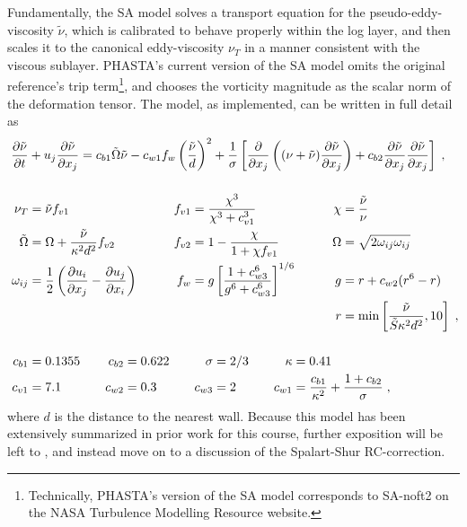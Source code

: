 \documentclass[11pt]{article}
\begin{document}
Fundamentally, the SA model solves a transport equation for the pseudo-eddy-viscosity $\tilde{\nu}$, which is calibrated to behave properly within the log layer, and then scales it to the canonical eddy-viscosity $\nu_T$ in a manner consistent with the viscous sublayer. PHASTA's current version of the SA model omits the original reference's trip term\footnote{Technically, PHASTA's version of the SA model corresponds to SA-noft2 on the NASA Turbulence Modelling Resource website.}, and chooses the vorticity magnitude as the scalar norm of the deformation tensor. The model, as implemented, can be written in full detail as
\begin{align}
	\phantom{W_{ij}}
	&\begin{aligned}
		\mathllap{\pp{\tilde{\nu}}{t}}
		&+ u_j \pp{\tilde{\nu}}{x_j}
		=
		c_{b1} \tilde{\Omega} \tilde{\nu}
		-
		c_{w1} f_w \left( \frac{\tilde{\nu}}{d} \right)^2
		+
		\frac{1}{\sigma} 
		\left[
		\pp{}{x_j}
			\left( (\nu + \tilde{\nu}) \pp{\tilde{\nu}}{x_j} \right)
			+ c_{b2} \pp{\tilde{\nu}}{x_j} \pp{\tilde{\nu}}{x_j}
		\right]
		\;,
		\label{eq:SA_transport}
	\end{aligned} \\[0.5cm]
	&\begin{aligned}
		\mathllap{\nu_T} &= \tilde{\nu} f_{v1}
		&\qquad
		f_{v1} &= \frac{\chi^3}{\chi^3 + c_{v1}^3}
		&\qquad
		\chi &= \frac{\tilde{\nu}}{\nu}
		\\
		\mathllap{\tilde{\Omega}} &= \Omega + \frac{\tilde{\nu}}{\kappa^2 d^2} f_{v2}
		&\qquad
		f_{v2} &= 1 - \frac{\chi}{1 + \chi f_{v1}}
		&\qquad
		\Omega &= \sqrt{2 \omega_{ij} \omega_{ij}}
		\\
		\mathllap{\omega_{ij}} &= \frac{1}{2} \left( \pp{u_i}{x_j} - \pp{u_j}{x_i} \right)
		&\qquad
		f_w &= g \left[ \frac{1 + c_{w3}^6}{g^6 + c_{w3}^6} \right]^{1/6}
		&\qquad
		g &= r + c_{w2}(r^6 - r)
		\\
		&&&&
		r &= \min \left[ \frac{\tilde{\nu}}{\tilde{S} \kappa^2 d^2}, 10 \right]
		\;,
		\label{eq:SA_definitions}
	\end{aligned} \\[0.5cm]
	&\begin{aligned}
		\mathllap{c_{b1}} &= 0.1355
		&\quad
		c_{b2} &= 0.622
		&\quad
		\sigma &= 2/3
		&\quad
		\kappa &= 0.41
		\\
		\mathllap{c_{v1}} &= 7.1
		&\quad
		c_{w2} &= 0.3
		&\quad
		c_{w3} &= 2
		&\quad
		c_{w1} &= \frac{c_{b1}}{\kappa^2} + \frac{1 + c_{b2}}{\sigma}
		\;,
		\label{eq:SA_constants}
	\end{aligned}
\end{align}
where $d$ is the distance to the nearest wall. Because this model has been extensively summarized in prior work for this course, further exposition will be left to \citet{spalart1992}, and instead move on to a discussion of the Spalart-Shur RC-correction.
\end{document}

